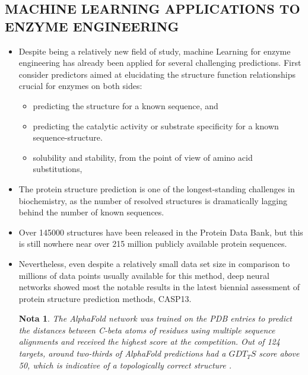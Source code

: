 \documentclass[12pt]{article}
\newtheorem{Note}{Nota}%
\begin{document}
\subsection{MACHINE LEARNING APPLICATIONS TO ENZYME ENGINEERING}

\begin{itemize}

\item Despite being a relatively new field of study,  machine Learning for enzyme engineering has already been applied for several challenging predictions.  First consider predictors aimed at elucidating the structure function relationships crucial for enzymes on both sides:

\begin{itemize}
\item predicting the structure for a known sequence, and 

\item predicting the catalytic activity or substrate specificity for a known sequence-structure. 
\item solubility and stability, from the point of view of amino acid substitutions,

\end{itemize}

\item The protein structure prediction is one of the longest-standing challenges in biochemistry, as the number of resolved structures is dramatically lagging behind the number of known sequences.

\item Over 145000 structures have been released in the Protein Data Bank, but this is still nowhere near over 215 million publicly available protein sequences\cite{28}. 

\item Nevertheless, even despite a relatively small data set size in comparison to millions of data points usually available for this method, deep neural networks showed most the notable results in the latest biennial assessment of protein structure prediction methods, CASP13. 

\begin{Note}
The AlphaFold network was trained on the PDB entries to predict the distances between C-beta atoms of residues using multiple sequence alignments\cite{60} and received the highest score at the competition. Out of 124 targets, around two-thirds of AlphaFold predictions had a $GDT_TS$ score above 50, which is indicative of a topologically correct structure \cite{61}.
\end{Note}


\end{itemize}
\end{document}

